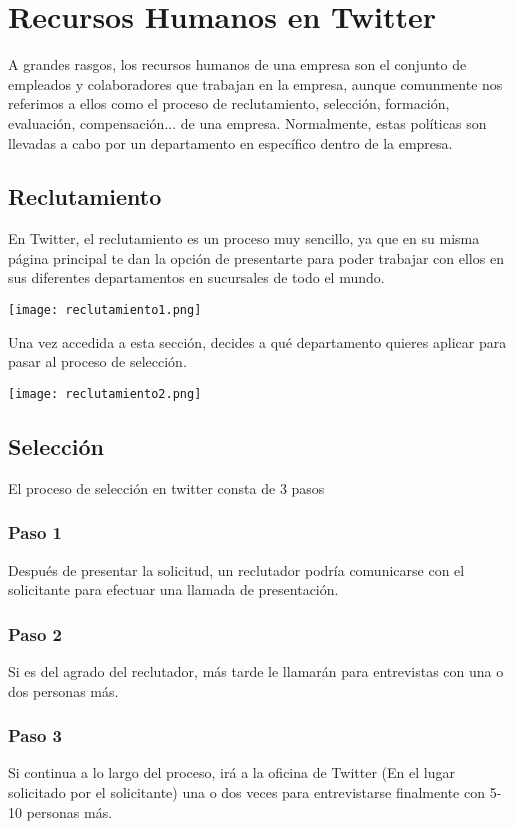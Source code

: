 

\section{Recursos Humanos en Twitter}

A grandes rasgos, los recursos humanos de una empresa son el conjunto de empleados y colaboradores que
trabajan en la empresa, aunque comunmente nos referimos a ellos como el proceso de reclutamiento, selección, formación, evaluación, compensación... de una empresa. Normalmente, estas políticas son llevadas a cabo por un departamento en específico dentro de la empresa.

\subsection{Reclutamiento}

En Twitter, el reclutamiento es un proceso muy sencillo, ya que en su misma página principal te dan la opción de presentarte para poder trabajar con ellos en sus diferentes departamentos en sucursales de todo el mundo.

\texttt{[image: reclutamiento1.png]}
\newpage

Una vez accedida a esta sección, decides a qué departamento quieres aplicar para pasar al proceso de selección.

\texttt{[image: reclutamiento2.png]}

\subsection{Selección}

El proceso de selección en twitter consta de 3 pasos

\subsubsection{Paso 1}
Después de presentar la solicitud, un reclutador podría comunicarse con el solicitante para efectuar una llamada de presentación.

\subsubsection{Paso 2}
Si es del agrado del reclutador, más tarde le llamarán para entrevistas con una o dos personas más.

\subsubsection{Paso 3}
Si continua a lo largo del proceso, irá a la oficina de Twitter (En el lugar solicitado por el solicitante) una o dos veces para entrevistarse finalmente con 5-10 personas más.

